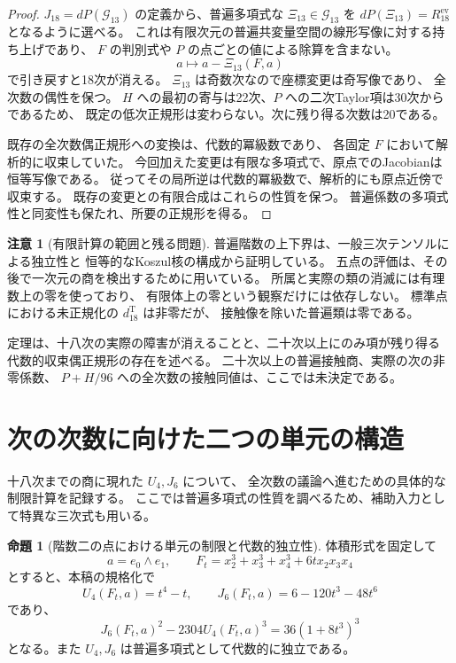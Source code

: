 \documentclass[a4paper,11pt]{ltjsarticle}
\theoremstyle{definition}
\newtheorem{remark}[theorem]{注意}
\newtheorem{proposition}[theorem]{命題}
\begin{document}
\begin{proof}
$J_{18}=dP(\mathcal G_{13})$ の定義から、普遍多項式な
$\Xi_{13}\in\mathcal G_{13}$ を
$dP(\Xi_{13})=R_{18}^{\mathrm{ev}}$ となるように選べる。
これは有限次元の普遍共変量空間の線形写像に対する持ち上げであり、
$F$ の判別式や $P$ の点ごとの値による除算を含まない。
\[
 a\longmapsto a-\Xi_{13}(F,a)
\]
で引き戻すと18次が消える。
$\Xi_{13}$ は奇数次なので座標変更は奇写像であり、
全次数の偶性を保つ。
$H$ への最初の寄与は22次、$P$ への二次Taylor項は30次からであるため、
既定の低次正規形は変わらない。次に残り得る次数は20である。

既存の全次数偶正規形への変換は、代数的冪級数であり、
各固定 $F$ において解析的に収束していた。
今回加えた変更は有限な多項式で、原点でのJacobianは恒等写像である。
従ってその局所逆は代数的冪級数で、解析的にも原点近傍で収束する。
既存の変更との有限合成はこれらの性質を保つ。
普遍係数の多項式性と同変性も保たれ、所要の正規形を得る。
\end{proof}

\begin{remark}[有限計算の範囲と残る問題]
普遍階数の上下界は、一般三次テンソルによる独立性と
恒等的なKoszul核の構成から証明している。
五点の評価は、その後で一次元の商を検出するために用いている。
所属と実際の類の消滅には有理数上の零を使っており、
有限体上の零という観察だけには依存しない。
標準点における未正規化の $d^{\mathrm T}_{18}$ は非零だが、
接触像を除いた普遍類は零である。

定理は、十八次の実際の障害が消えることと、二十次以上にのみ項が残り得る
代数的収束偶正規形の存在を述べる。
二十次以上の普遍接触商、実際の次の非零係数、
$P+H/96$ への全次数の接触同値は、ここでは未決定である。
\end{remark}



\section{次の次数に向けた二つの単元の構造}
\label{sec:v14-unit-structure}

十八次までの商に現れた $U_4,J_6$ について、
全次数の議論へ進むための具体的な制限計算を記録する。
ここでは普遍多項式の性質を調べるため、補助入力として特異な三次式も用いる。

\begin{proposition}[階数二の点における単元の制限と代数的独立性]
\label{prop:v14-rank-two-unit-restriction}
体積形式を固定して
\[
 a=e_0\wedge e_1,\qquad
 F_t=x_2^3+x_3^3+x_4^3+6t x_2x_3x_4
\]
とすると、本稿の規格化で
\[
 U_4(F_t,a)=t^4-t,\qquad
 J_6(F_t,a)=6-120t^3-48t^6
\]
であり、
\[
 J_6(F_t,a)^2-2304U_4(F_t,a)^3=36(1+8t^3)^3
\]
となる。また $U_4,J_6$ は普遍多項式として代数的に独立である。
\end{proposition}
\end{document}
